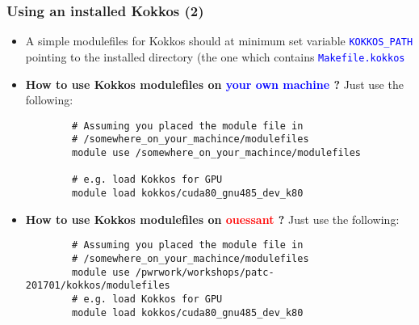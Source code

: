 \begin{frame}[fragile=singleslide]
  \frametitle{Using an installed Kokkos (2)}

  \begin{itemize}
  \item A simple modulefiles for Kokkos should at minimum set variable \textcolor{blue}{\texttt{KOKKOS\_PATH}} pointing to the installed directory (the one which contains \textcolor{blue}{\texttt{Makefile.kokkos}}
  \item {\bf How to use Kokkos modulefiles on \textcolor{blue}{your own machine} ?} Just use the following:
    {\small
      \begin{verbatim}
        # Assuming you placed the module file in
        # /somewhere_on_your_machince/modulefiles
        module use /somewhere_on_your_machince/modulefiles

        # e.g. load Kokkos for GPU
        module load kokkos/cuda80_gnu485_dev_k80
      \end{verbatim}
    }
  \item {\bf How to use Kokkos modulefiles on \textcolor{red}{ouessant} ?} Just use the following:
    {\small
      \begin{verbatim}
        # Assuming you placed the module file in
        # /somewhere_on_your_machince/modulefiles
        module use /pwrwork/workshops/patc-201701/kokkos/modulefiles
        # e.g. load Kokkos for GPU
        module load kokkos/cuda80_gnu485_dev_k80
      \end{verbatim}
    }
  \end{itemize}

\end{frame}
